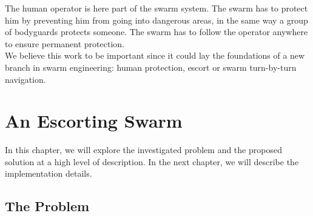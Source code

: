 \documentclass[oneside, a4paper, 12pt]{memoir}
\begin{document}
	The human operator is here part of the swarm system. The swarm has to protect him by preventing him from going into dangerous areas, in the same way a group of bodyguards protects someone. The swarm has to follow the operator anywhere to ensure permanent protection.\\
	
	We believe this work to be important since it could lay the foundations of a new branch in swarm engineering: human protection, escort or swarm turn-by-turn navigation.

\chapter{An Escorting Swarm}
\label{chap:escorting_swarm}

In this chapter, we will explore the investigated problem and the proposed solution at a high level of description. In the next chapter, we will describe the implementation details.

	\section{The Problem}
	

	
\end{document}
